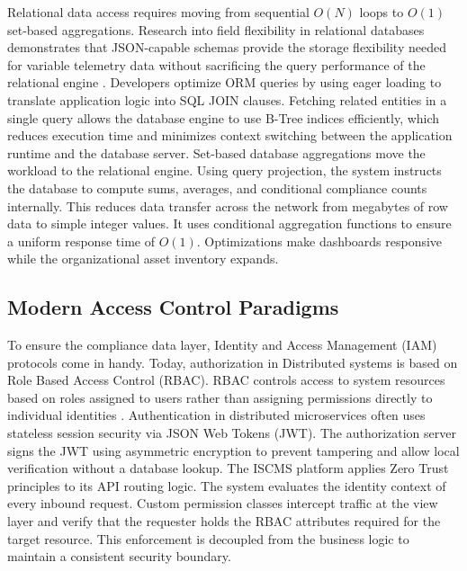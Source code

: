 Relational data access requires moving from sequential $O(N)$ loops to $O(1)$ set-based aggregations. Research into field flexibility in relational databases demonstrates that JSON-capable schemas provide the storage flexibility needed for variable telemetry data without sacrificing the query performance of the relational engine \cite{aji2026evaluating}. Developers optimize ORM queries by using eager loading to translate application logic into SQL JOIN clauses. Fetching related entities in a single query allows the database engine to use B-Tree indices efficiently, which reduces execution time and minimizes context switching between the application runtime and the database server. Set-based database aggregations move the workload to the relational engine. Using query projection, the system instructs the database to compute sums, averages, and conditional compliance counts internally. This reduces data transfer across the network from megabytes of row data to simple integer values. It uses conditional aggregation functions to ensure a uniform response time of $O(1)$. Optimizations make dashboards responsive while the organizational asset inventory expands.

\subsection{Modern Access Control Paradigms}
To ensure the compliance data layer, Identity and Access Management (IAM) protocols come in handy. Today, authorization in Distributed systems is based on Role Based Access Control (RBAC). RBAC controls access to system resources based on roles assigned to users rather than assigning permissions directly to individual identities \cite{cat2025implementing}. Authentication in distributed microservices often uses stateless session security via JSON Web Tokens (JWT). The authorization server signs the JWT using asymmetric encryption to prevent tampering and allow local verification without a database lookup. The ISCMS platform applies Zero Trust principles to its API routing logic. The system evaluates the identity context of every inbound request. Custom permission classes intercept traffic at the view layer and verify that the requester holds the RBAC attributes required for the target resource. This enforcement is decoupled from the business logic to maintain a consistent security boundary.

